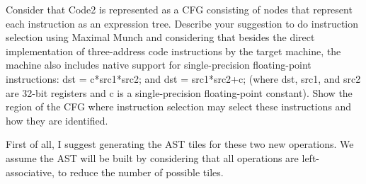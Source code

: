 \documentclass[docid=2021]{comp_exam_round1}
\begin{document}
\examgroup{}

\question
Consider that Code2 is represented as a CFG consisting of nodes that represent each instruction as an expression tree. Describe your suggestion to do instruction selection using Maximal Munch and considering that besides the direct implementation of three-address code instructions by the target machine, the machine also includes native support for single-precision floating-point instructions: dst = c*src1*src2; and dst = src1*src2+c; (where dst, src1, and src2 are 32-bit registers and c is a single-precision floating-point constant). Show the region of the CFG where instruction selection may select these instructions and how they are identified.

\ansseparator

\noindent
First of all, I suggest generating the AST tiles for these two new operations. We assume the AST will be built by considering that all operations are left-associative, to reduce the number of possible tiles.
\end{document}
